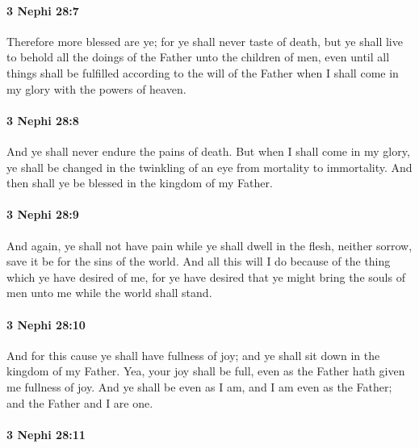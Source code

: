 		\paragraph{3 Nephi 28:7} %
			\label{3NEPHI-28-7}

			Therefore more blessed are ye;
			for ye shall never taste of death,
			but ye shall live to behold all the doings of the Father unto the children of men,
			even until all things shall be fulfilled according to the will of the Father
			when I shall come in my glory with the powers of heaven.

		\paragraph{3 Nephi 28:8} %
			\label{3NEPHI-28-8}

			And ye shall never endure the pains of death.
			But when I shall come in my glory,
			ye shall be changed in the twinkling of an eye from mortality to immortality.
			And then shall ye be blessed in the kingdom of my Father.

		\paragraph{3 Nephi 28:9} %
			\label{3NEPHI-28-9}

			And again, ye shall not have pain while ye shall dwell in the flesh,
			neither sorrow, save it be for the sins of the world.
			And all this will I do because of the thing which ye have desired of me,
			for ye have desired that ye might bring the souls of men unto me
			while the world shall stand.

		\paragraph{3 Nephi 28:10} %
			\label{3NEPHI-28-10}

			And for this cause ye shall have fullness of joy;
			and ye shall sit down in the kingdom of my Father.
			Yea, your joy shall be full, even as the Father hath given me fullness of joy.
			And ye shall be even as I am,
			and I am even as the Father;
			and the Father and I are one.

		\paragraph{3 Nephi 28:11} %
			\label{3NEPHI-28-11}

